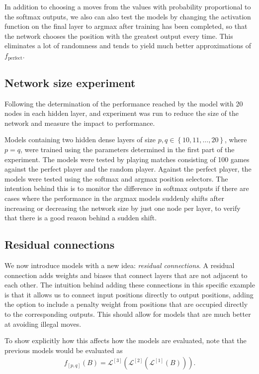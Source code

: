 \documentclass{somasmsc}
\begin{document}
In addition to choosing a moves from the values with probability proportional to the softmax outputs, we also can also test the models by changing the activation function on the final layer to argmax after training has been completed, so that the network chooses the position with the greatest output every time. This eliminates a lot of randomness and tends to yield much better approximations of $f_{\text{perfect}}$.

\subsection{Network size experiment}\label{ox:dense_ex}

Following the determination of the performance reached by the model with 20 nodes in each hidden layer, and experiment was run to reduce the size of the network and measure the impact to performance.

Models containing two hidden dense layers of size $p,q \in \left\{10, 11, \dots, 20\right\}$, where $p=q$, were trained using the parameters determined in the first part of the experiment. The models were tested by playing matches consisting of 100 games against the perfect player and the random player. Against the perfect player, the models were tested using the softmax and argmax position selectors. The intention behind this is to monitor the difference in softmax outputs if there are cases where the performance in the argmax models suddenly shifts after increasing or decreasing the network size by just one node per layer, to verify that there is a good reason behind a sudden shift.

\subsection{Residual connections}

We now introduce models with a new idea: \textit{residual connections}. A residual connection adds weights and biases that connect layers that are not adjacent to each other. The intuition behind adding these connections in this specific example is that it allows us to connect input positions directly to output positions, adding the option to include a penalty weight from positions that are occupied directly to the corresponding outputs. This should allow for models that are much better at avoiding illegal moves.

To show explicitly how this affects how the models are evaluated, note that the previous models would be evaluated as
\begin{align*}
    f_{\left[p,q\right]}\left(B\right) = \mathcal{L}^{\left[3\right]}\left( \mathcal{L}^{\left[2\right]}\left( \mathcal{L}^{\left[1\right]}\left(B\right)\right)\right).
\end{align*}
\end{document}
